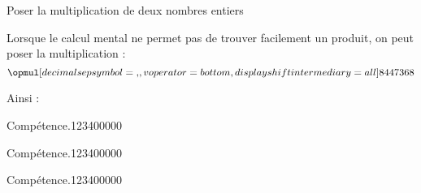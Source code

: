 \begin{pageCours}
\begin{MtT}{Poser la multiplication de deux nombres entiers}

Lorsque le calcul mental ne permet pas de trouver facilement un produit, on peut poser la multiplication :
\[\opmul[decimalsepsymbol={,},
voperator=bottom,
displayshiftintermediary=all]{8447}{368}\]

Ainsi : 
\end{MtT} 

\end{pageCours} %


\begin{pageAD}  %
\restoregeometry %


\begin{ExoCad}{Compétence.}{1234}{0}{0}{0}{0}{0}

\end{ExoCad}


\begin{ExoCad}{Compétence.}{1234}{0}{0}{0}{0}{0}

\end{ExoCad}


\begin{ExoCad}{Compétence.}{1234}{0}{0}{0}{0}{0}

\end{ExoCad}
 
\end{pageAD} %


